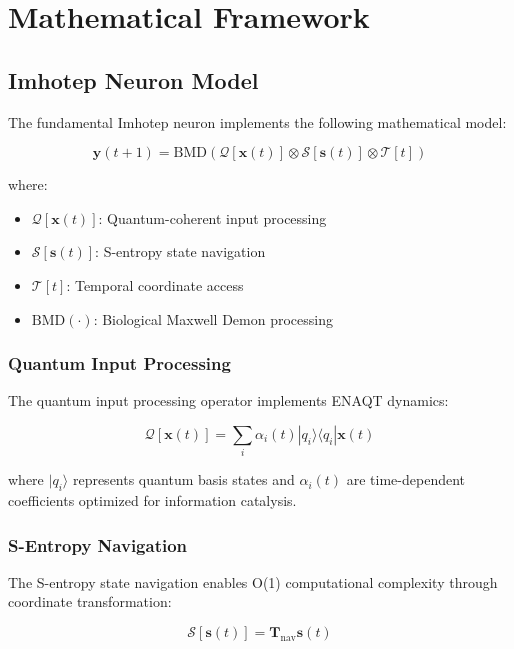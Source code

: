 \documentclass[12pt,a4paper]{article}
\theoremstyle{remark}
\begin{document}
\section{Mathematical Framework}

\subsection{Imhotep Neuron Model}

The fundamental Imhotep neuron implements the following mathematical model:

\begin{equation}
\mathbf{y}(t+1) = \text{BMD}\left(\mathcal{Q}[\mathbf{x}(t)] \otimes \mathcal{S}[\mathbf{s}(t)] \otimes \mathcal{T}[t]\right)
\end{equation}

where:
\begin{itemize}
\item $\mathcal{Q}[\mathbf{x}(t)]$: Quantum-coherent input processing
\item $\mathcal{S}[\mathbf{s}(t)]$: S-entropy state navigation
\item $\mathcal{T}[t]$: Temporal coordinate access
\item $\text{BMD}(\cdot)$: Biological Maxwell Demon processing
\end{itemize}

\subsubsection{Quantum Input Processing}

The quantum input processing operator implements ENAQT dynamics:

\begin{equation}
\mathcal{Q}[\mathbf{x}(t)] = \sum_i \alpha_i(t) |q_i\rangle \langle q_i| \mathbf{x}(t)
\end{equation}

where $|q_i\rangle$ represents quantum basis states and $\alpha_i(t)$ are time-dependent coefficients optimized for information catalysis.

\subsubsection{S-Entropy Navigation}

The S-entropy state navigation enables O(1) computational complexity through coordinate transformation:

\begin{equation}
\mathcal{S}[\mathbf{s}(t)] = \mathbf{T}_{\text{nav}} \mathbf{s}(t)
\end{equation}
\end{document}
